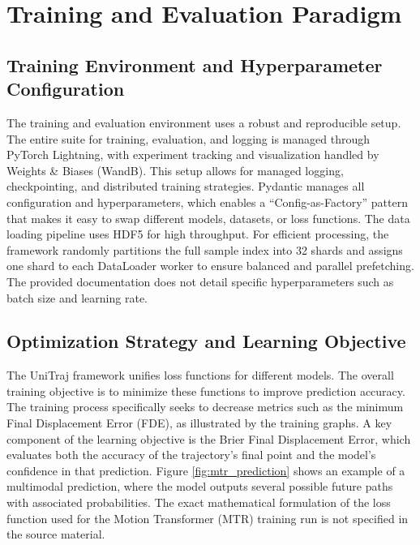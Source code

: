 \section{Training and Evaluation Paradigm}
\label{ch:experimental_design}

\subsection{Training Environment and Hyperparameter Configuration}
\label{sec:exp_training_env}
The training and evaluation environment uses a robust and reproducible setup. The entire suite for training, evaluation, and logging is managed through PyTorch Lightning, with experiment tracking and visualization handled by Weights \& Biases (WandB). This setup allows for managed logging, checkpointing, and distributed training strategies. Pydantic manages all configuration and hyperparameters, which enables a ``Config-as-Factory'' pattern that makes it easy to swap different models, datasets, or loss functions. The data loading pipeline uses HDF5 for high throughput. For efficient processing, the framework randomly partitions the full sample index into 32 shards and assigns one shard to each DataLoader worker to ensure balanced and parallel prefetching. The provided documentation does not detail specific hyperparameters such as batch size and learning rate.
 
\subsection{Optimization Strategy and Learning Objective}
\label{sec:exp_optimization}
The UniTraj framework unifies loss functions for different models. The overall training objective is to minimize these functions to improve prediction accuracy. The training process specifically seeks to decrease metrics such as the minimum Final Displacement Error (FDE), as illustrated by the training graphs. A key component of the learning objective is the Brier Final Displacement Error, which evaluates both the accuracy of the trajectory's final point and the model's confidence in that prediction. Figure \ref{fig:mtr_prediction} shows an example of a multimodal prediction, where the model outputs several possible future paths with associated probabilities. The exact mathematical formulation of the loss function used for the Motion Transformer (MTR) training run is not specified in the source material.
 
